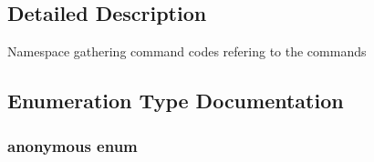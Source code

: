 \subsection{Detailed Description}
Namespace gathering command codes refering to the commands 

\subsection{Enumeration Type Documentation}
\hypertarget{namespace_c_m_d_a29d3221fd651d37c461db812371ba67b}{\subsubsection[{anonymous enum}]{\setlength{\rightskip}{0pt plus 5cm}anonymous enum}}\label{namespace_c_m_d_a29d3221fd651d37c461db812371ba67b}

